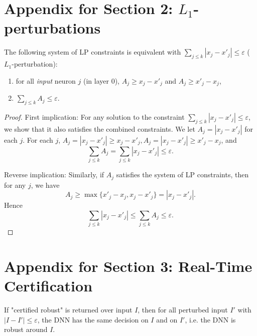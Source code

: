

\section{Appendix for Section 2: $L_1$-perturbations}

\label{app.L1}

\setcounter{proposition}{1}



\begin{proposition}
	The following system of LP constraints is equivalent with $\sum_{j\leq k} |x_j-x'_j| \leq \varepsilon$ ($L_1$-perturbation):
	
	\begin{enumerate}
		\item for all {\em input} neuron $j$ (in layer 0), 
		$A_j \geq x_j - x'_j $ and $A_j \geq x'_j - x_j$,
		
		\item $\sum_{j\leq k} A_j \leq \varepsilon$.
	\end{enumerate}
\end{proposition}


\begin{proof}[Proof] First implication: For any solution to the constraint $\sum_{j\leq k} |x_j-x'_j| \leq \varepsilon$, we show that it also satisfies the combined constraints. 
	We let $A_j = |x_j-x'_j|$ for each $j$. For each $j$, $A_j = |x_j-x'_j|\geq x_j - x'_j, A_j = |x_j-x'_j|\geq x'_j - x_j$,  and $$\sum_{j\leq k} A_j = \sum_{j\leq k} |x_j-x'_j| \leq\varepsilon.$$
	
	
Reverse implication: Similarly, if $A_j$ satisfies the system of LP constraints, then for any $j$, we have $$A_j \geq \max\{x'_j - x_j, x_j - x'_j\} = |x_j-x'_j|.$$ Hence $$\sum_{j\leq k} |x_j-x'_j| \leq \sum_{j\leq k} A_j\leq\varepsilon.$$
\end{proof}



\section{Appendix for Section 3: Real-Time Certification}

\label{app.realtime}

\begin{proposition}
If "certified robust" is returned over input $I$, 
then for all perturbed input $I'$ with  $|I - I'| \leq \varepsilon$,
the DNN has the same decision on $I$ and on $I'$, i.e. the DNN is robust around $I$. %
\end{proposition}

